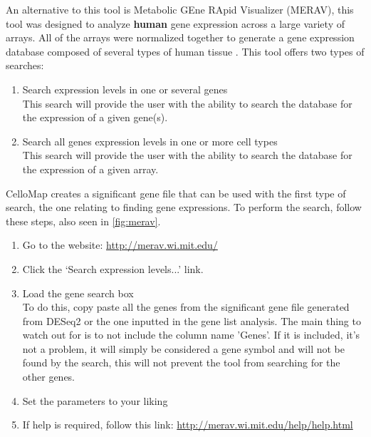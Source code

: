 \documentclass[11pt]{article}
\begin{document}
An alternative to this tool is Metabolic GEne RApid Visualizer (MERAV), this tool was designed to analyze \textbf{human} gene expression across a large variety of arrays. All of the arrays were normalized together to generate a gene expression database composed of several types of human tissue \cite{shaul2015merav}.
This tool offers two types of searches:
\begin{enumerate}
\item Search expression levels in one or several genes\\
This search will provide the user with the ability to search the database for the expression of a given gene(s).
\item Search all genes expression levels in one or more cell types\\
This search will provide the user with the ability to search the database for the expression of a given array.
\end{enumerate}

CelloMap creates a significant gene file that can be used with the first type of search, the one relating to finding gene expressions. To perform the search, follow these steps, also seen in \autoref{fig:merav}.
\begin{enumerate}
\item Go to the website: \url{http://merav.wi.mit.edu/}
\item Click the `Search expression levels...' link.
\item Load the gene search box\\
To do this, copy paste all the genes from the significant gene file generated from DESeq2 or the one inputted in the gene list analysis. The main thing to watch out for is to not include the column name 'Genes'. If it is included, it's not a problem, it will simply be considered a gene symbol and will not be found by the search, this will not prevent the tool from searching for the other genes.
\item Set the parameters to your liking
\item If help is required, follow this link: \url{http://merav.wi.mit.edu/help/help.html}
\end{enumerate}
\end{document}
